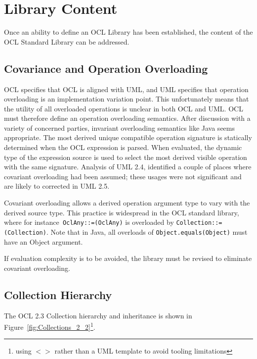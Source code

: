 \documentclass{eceasst}
\begin{document}
\section{Library Content}\label{LibraryContent}

Once an ability to define an OCL Library has been established, the content of the OCL Standard Library can be addressed. 

\subsection{Covariance and Operation Overloading}

OCL specifies that OCL is aligned with UML, and UML specifies that operation overloading is an implementation variation point. This unfortunately means that the utility of all overloaded operations is unclear in both OCL and UML. OCL must therefore define an operation overloading semantics. After discussion with a variety of concerned parties, invariant overloading semantics like Java seems appropriate. The most derived unique compatible operation signature is statically determined when the OCL expression is parsed. When evaluated, the dynamic type of the expression source is used to select the most derived visible operation with the same signature. Analysis of UML 2.4, identified a couple of places where covariant overloading had been assumed; these usages were not significant and are likely to corrected in UML 2.5.

Covariant overloading allows a derived operation argument type to vary with the derived source type. This practice is widespread in the OCL standard library, where for instance\verb| OclAny::=(OclAny)| is overloaded by \verb|Collection::=(Collection)|. Note that in Java, all overloads of \verb|Object.equals(Object)| must have an Object argument.

If evaluation complexity is to be avoided, the library must be revised to eliminate covariant overloading.

\subsection{Collection Hierarchy}

The OCL 2.3 Collection hierarchy and inheritance is shown in Figure~\ref{fig:Collections_2_2}\footnote{using $< >$ rather than a UML template to avoid tooling limitations}.
\end{document}
